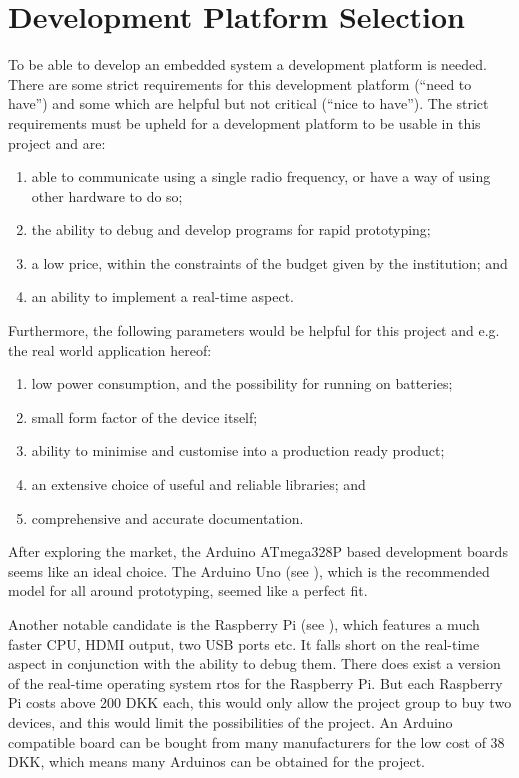 
\section{Development Platform Selection}
To be able to develop an embedded system a development platform is needed. 
There are some strict requirements for this development platform (``need to have'') and some which are helpful but not critical (``nice to have'').
The strict requirements must be upheld for a development platform to be usable in this project and are:

\begin{enumerate}[label=\itshape \alph*\upshape)]
\item able to communicate using a single radio frequency, or have a way of using other hardware to do so;
\item the ability to debug and develop programs for rapid prototyping;
\item a low price, within the constraints of the budget given by the institution;
and
\item an ability to implement a real-time aspect.
\end{enumerate}

\noindent
Furthermore, the following parameters would be helpful for this project and e.g. the real world application hereof:

\begin{enumerate}[label=\itshape \alph*\upshape), resume]
\item low power consumption, and the possibility for running on batteries;
\item small form factor of the device itself;
\item ability to minimise and customise into a production ready product;
\item an extensive choice of useful and reliable libraries;
and
\item comprehensive and accurate documentation.
\end{enumerate}

\bigskip
\noindent
After exploring the market, the Arduino ATmega328P based development boards seems like an ideal choice.
The Arduino Uno (see \cite{ArduinoUNO}), which is the recommended model for all around prototyping, seemed like a perfect fit.

Another notable candidate is the Raspberry Pi (see \cite{RaspberryPI}), which features a much faster CPU, HDMI output, two USB ports etc.
It falls short on the real-time aspect in conjunction with the ability to debug them. 
There does exist a version of the real-time operating system \gls{rtos} for the Raspberry Pi.
But each Raspberry Pi costs above 200 DKK each, this would only allow the project group to buy two devices, and this would limit the possibilities of the project.
An Arduino compatible board can be bought from many manufacturers for the low cost of 38 DKK, which means many Arduinos can be obtained for the project.

